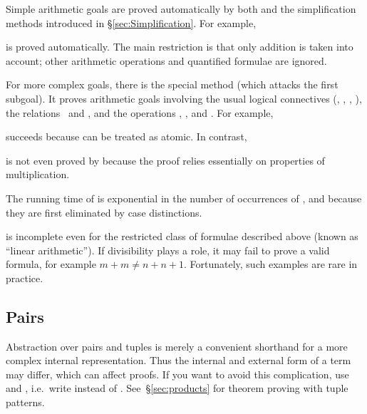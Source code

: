 Simple arithmetic goals are proved automatically by both 
and the simplification methods introduced in \S\ref{sec:Simplification}.  For
example,

%
is proved automatically. The main restriction is that only addition is taken
into account; other arithmetic operations and quantified formulae are ignored.

For more complex goals, there is the special method
 (which attacks the first subgoal). It proves
arithmetic goals involving the usual logical connectives (\isasymnot,
\isasymand, \isasymor, \isasymimp), the relations \isasymle\ and \isa{<}, and
the operations \isa{+}, \isa{-},  and . For example,

%
succeeds because  can be treated as atomic.
In contrast,

%
is not even proved by  because the proof relies essentially
on properties of multiplication.

\begin{warn}
  The running time of  is exponential in the number of occurrences
  of ,  and
   because they are first eliminated by case distinctions.

   is incomplete even for the restricted class of formulae
  described above (known as ``linear arithmetic''). If divisibility plays a
  role, it may fail to prove a valid formula, for example $m+m \neq n+n+1$.
  Fortunately, such examples are rare in practice.
\end{warn}



\subsection{Pairs}


\begin{warn}
  Abstraction over pairs and tuples is merely a convenient shorthand for a
  more complex internal representation.  Thus the internal and external form
  of a term may differ, which can affect proofs. If you want to avoid this
  complication, use  and , i.e.\ write
   instead of
  .  See~\S\ref{sec:products} for
  theorem proving with tuple patterns.
\end{warn}

